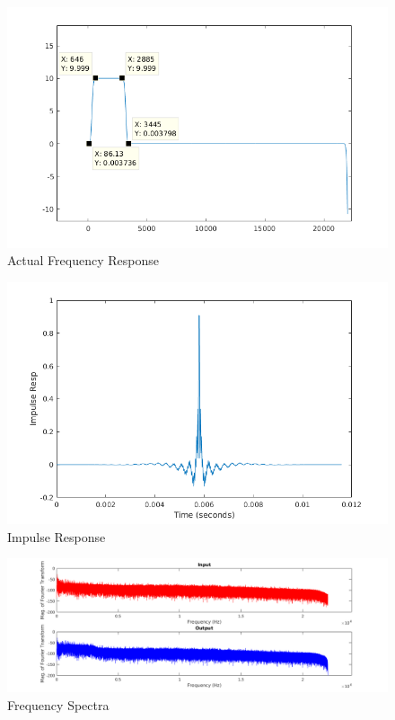 \documentclass[titlepage]{article}
\begin{document}
\begin{figure}[htbp]
\centering
\includegraphics[width=.9\linewidth]{fr_b.png}
\caption{Actual Frequency Response}
\end{figure}

\begin{figure}[htbp]
\centering
\includegraphics[width=.9\linewidth]{ir_b.png}
\caption{Impulse Response}
\end{figure}

\begin{figure}[htbp]
\centering
\includegraphics[width=.9\linewidth]{fs_b.png}
\caption{Frequency Spectra}
\end{figure}
\end{document}

